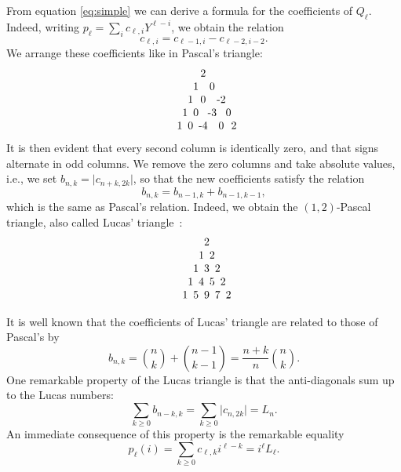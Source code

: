 \documentclass[11pt]{article}
\begin{document}
From equation \eqref{eq:simple} we can derive a formula for the
coefficients of $Q_\ell$. Indeed, writing $p_\ell = \sum_i
c_{\ell,i}Y^{\ell-i}$, we obtain the relation
\begin{equation}
  c_{\ell,i} = c_{\ell-1,i} - c_{\ell-2,i-2}.
\end{equation}
We arrange these coefficients like in Pascal's triangle:
\begin{equation}
  \begin{tabular}{*{9}{c@{}}}
    &&&&2\\
    &&&1&&0\\
    &&1&&0&&-2\\
    &1&&0&&-3&&0\\
    1&&0&&-4&&0&&2
  \end{tabular}
\end{equation}
It is then evident that every second column is identically zero, and
that signs alternate in odd columns. We remove the zero columns and
take absolute values, i.e., we set $b_{n,k}=\lvert c_{n+k,2k}\rvert$, so
that the new coefficients satisfy the relation
\begin{equation}
  b_{n,k} = b_{n-1,k} + b_{n-1,k-1},
\end{equation}
which is the same as Pascal's relation. Indeed, we obtain the
$(1,2)$-Pascal triangle, also called Lucas' triangle~\cite{benjamin10}:
\begin{equation}
  \begin{tabular}{*{9}{c@{}}}
    &&&&2\\
    &&&1&&2\\
    &&1&&3&&2\\
    &1&&4&&5&&2\\
    1&&5&&9&&7&&2
  \end{tabular}
\end{equation}

It is well known that the coefficients of Lucas' triangle are related
to those of Pascal's by
\begin{equation}
  \label{eq:lucas-tri}
  b_{n,k} = \binom{n}{k} + \binom{n-1}{k-1} = \frac{n+k}{n}\binom{n}{k}.
\end{equation}
One remarkable property of the Lucas triangle is that the
anti-diagonals sum up to the Lucas numbers:
\begin{equation}
  \sum_{k\ge0} b_{n-k,k} = \sum_{k\ge0} \lvert c_{n,2k}\rvert = L_n.
\end{equation}
An immediate consequence of this property is the remarkable equality
\begin{equation}
  p_\ell(i) = \sum_{k\ge0} c_{\ell,k}i^{\ell-k} = i^\ell L_\ell.
\end{equation}
\end{document}
